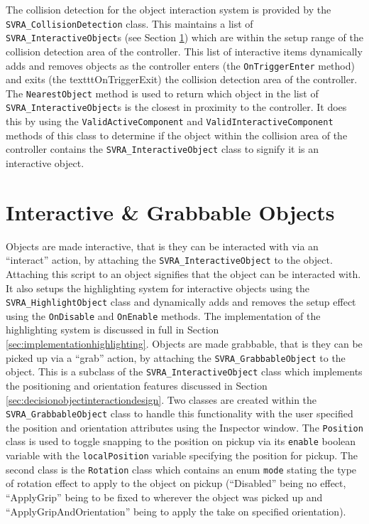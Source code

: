 \documentclass{l4proj}
\begin{document}
The collision detection for the object interaction system is provided by the \texttt{SVRA\_CollisionDetection} class. This maintains a list of \texttt{SVRA\_InteractiveObject}s (see Section \ref{sec:implementationinteractiveobjects}) which are within the setup range of the collision detection area of the controller. This list of interactive items dynamically adds and removes objects as the controller enters (the \texttt{OnTriggerEnter} method) and exits (the texttt{OnTriggerExit}) the collision detection area of the controller. The \texttt{NearestObject} method is used to return which object in the list of \texttt{SVRA\_InteractiveObject}s is the closest in proximity to the controller. It does this by using the \texttt{ValidActiveComponent} and \texttt{ValidInteractiveComponent} methods of this class to determine if the object within the collision area of the controller contains the \texttt{SVRA\_InteractiveObject} class to signify it is an interactive object.

\section{Interactive \& Grabbable Objects}
\label{sec:implementationinteractiveobjects}
Objects are made interactive, that is they can be interacted with via an ``interact'' action, by attaching the \texttt{SVRA\_InteractiveObject} to the object. Attaching this script to an object signifies that the object can be interacted with. It also setups the highlighting system for interactive objects using the \texttt{SVRA\_HighlightObject} class and dynamically adds and removes the setup effect using the \texttt{OnDisable} and \texttt{OnEnable} methods. The implementation of the highlighting system is discussed in full in Section \ref{sec:implementationhighlighting}. Objects are made grabbable, that is they can be picked up via a ``grab'' action, by attaching the \texttt{SVRA\_GrabbableObject} to the object. This is a subclass of the \texttt{SVRA\_InteractiveObject} class which implements the positioning and orientation features discussed in Section \ref{sec:decisionobjectinteractiondesign}. Two classes are created within the \texttt{SVRA\_GrabbableObject} class to handle this functionality with the user specified the position and orientation attributes using the Inspector window. The \texttt{Position} class is used to toggle snapping to the position on pickup via its \texttt{enable} boolean variable with the \texttt{localPosition} variable specifying the position for pickup. The second class is the \texttt{Rotation} class which contains an enum \texttt{mode} stating the type of rotation effect to apply to the object on pickup (``Disabled'' being no effect, ``ApplyGrip'' being to be fixed to wherever the object was picked up and ``ApplyGripAndOrientation'' being to apply the take on specified orientation).
\end{document}
